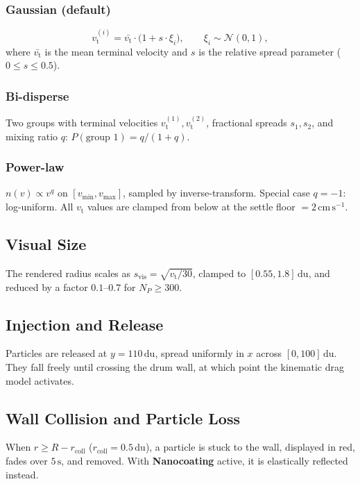 \documentclass[12pt, a4paper]{article}
\newcommand{\vt}{v_{\mathrm{t}}}
\begin{document}
\subsubsection{Gaussian (default)}
\begin{equation}
  \vt^{(i)} = \bar{\vt} \cdot \bigl(1 + s \cdot \xi_i\bigr),
  \qquad \xi_i \sim \mathcal{N}(0, 1),
\end{equation}
where $\bar{\vt}$ is the mean terminal velocity and $s$ is the relative spread
parameter ($0 \leq s \leq 0.5$).

\subsubsection{Bi-disperse}
Two groups with terminal velocities $\vt^{(1)}, \vt^{(2)}$, fractional
spreads $s_1, s_2$, and mixing ratio $q$:
$P(\text{group 1}) = q/(1 + q)$.

\subsubsection{Power-law}
$n(v) \propto v^q$ on $[v_{\min}, v_{\max}]$, sampled by inverse-transform.
Special case $q = -1$: log-uniform. All $\vt$ values are clamped from below
at the settle floor $= 2\,\mathrm{cm\,s^{-1}}$.

\subsection{Visual Size}

The rendered radius scales as $s_{\mathrm{vis}} = \sqrt{\vt / 30}$,
clamped to $[0.55, 1.8]\,\mathrm{du}$, and reduced by a factor $0.1$--$0.7$
for $N_P \geq 300$.

\subsection{Injection and Release}

Particles are released at $y = 110\,\mathrm{du}$, spread uniformly in $x$
across $[0, 100]\,\mathrm{du}$. They fall freely until crossing the drum wall,
at which point the kinematic drag model activates.

\subsection{Wall Collision and Particle Loss}

When $r \geq R - r_{\mathrm{coll}}$ ($r_{\mathrm{coll}} = 0.5\,\mathrm{du}$),
a particle is stuck to the wall, displayed in red, fades over $5\,\mathrm{s}$,
and removed. With \textbf{Nanocoating} active, it is elastically reflected
instead.
\end{document}
